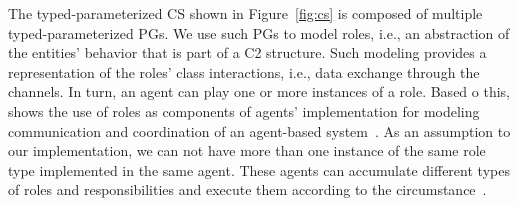 The typed-parameterized CS shown in Figure~\ref{fig:cs} is composed of multiple typed-parameterized PGs. We use such PGs to model roles, i.e., an abstraction of the entities' behavior that is part of a C2 structure. Such modeling provides a representation of the roles' class interactions, i.e., data exchange through the channels. In turn, an agent can play one or more instances of a role. Based o this, \cite{agent0010} shows the use of roles as components of agents' implementation for modeling communication and coordination of an agent-based system~\cite{agent1}. As an assumption to our implementation, we can not have more than one instance of the same role type implemented in the same agent. These agents can accumulate different types of roles and responsibilities and execute them according to the circumstance~\citep{weyns2019activforms}. 









%




